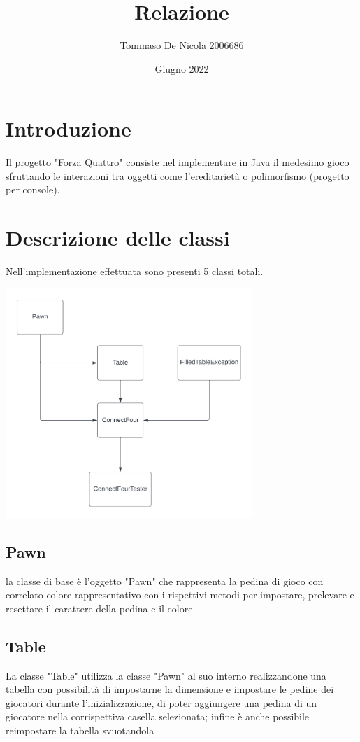 \documentclass{article}
\title{Relazione}
\author{Tommaso De Nicola 2006686}
\date{Giugno 2022}
\begin{document}
\maketitle

\centering

\section{Introduzione}
Il progetto "Forza Quattro" consiste nel implementare in Java il medesimo gioco sfruttando le interazioni tra oggetti come l'ereditarietà o polimorfismo (progetto per console).


\section{Descrizione delle classi}
Nell'implementazione effettuata sono presenti 5 classi totali.


\includegraphics[width=0.7\textwidth]{uml.png}


\subsection{Pawn}
la classe di base è l'oggetto "Pawn" che rappresenta la pedina di gioco con correlato colore rappresentativo con i rispettivi metodi per impostare, prelevare e resettare il carattere della pedina e il colore.


\subsection{Table}
La classe "Table" utilizza la classe "Pawn" al suo interno realizzandone una tabella con possibilità di impostarne la dimensione e impostare le pedine dei giocatori durante l'inizializzazione, di poter aggiungere una pedina di un giocatore nella corrispettiva casella selezionata; infine è anche possibile reimpostare la tabella svuotandola
\end{document}
